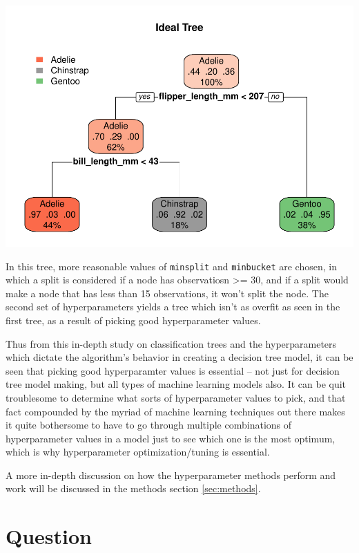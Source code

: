 \documentclass[12pt]{article}
\begin{document}
\includegraphics{deid_files/figure-latex/tree2.1-1.pdf}

In this tree, more reasonable values of \texttt{minsplit} and
\texttt{minbucket} are chosen, in which a split is considered if a node
has observatiosn \textgreater= 30, and if a split would make a node that
has less than 15 observations, it won't split the node. The second set
of hyperparameters yields a tree which isn't as overfit as seen in the
first tree, as a result of picking good hyperparameter values.

Thus from this in-depth study on classification trees and the
hyperparameters which dictate the algorithm's behavior in creating a
decision tree model, it can be seen that picking good hyperparamter
values is essential -- not just for decision tree model making, but all
types of machine learning models also. It can be quit troublesome to
determine what sorts of hyperparameter values to pick, and that fact
compounded by the myriad of machine learning techniques out there makes
it quite bothersome to have to go through multiple combinations of
hyperparameter values in a model just to see which one is the most
optimum, which is why hyperparameter optimization/tuning is essential.

A more in-depth discussion on how the hyperparameter methods perform and
work will be discussed in the methods section \ref{sec:methods}.

\newpage

\hypertarget{question}{%
\section{Question}\label{question}}
\end{document}
